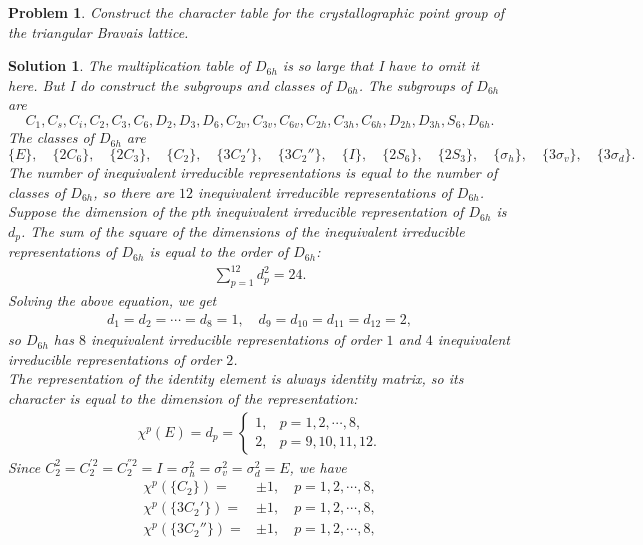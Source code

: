 \documentclass[UTF8,10pt,a4paper]{article}
\theoremstyle{Problem}
\newtheorem{prob}{Problem}
\theoremstyle{Solution}
\newtheorem*{sol}{Solution}
\begin{document}
\begin{prob}
    Construct the character table for the crystallographic point group of the triangular Bravais lattice.
\end{prob}
\begin{sol}
    The multiplication table of $D_{6h}$ is so large that I have to omit it here. But I do construct the subgroups and classes of $D_{6h}$. The subgroups of $D_{6h}$ are
    \[
        C_1,C_s,C_i,C_2,C_3,C_6,D_2,D_3,D_6,C_{2v},C_{3v},C_{6v},C_{2h},C_{3h},C_{6h},D_{2h},D_{3h},S_6,D_{6h}.
    \]
    The classes of $D_{6h}$ are
    \[
        \{E\},\quad\{2C_6\},\quad\{2C_3\},\quad\{C_2\},\quad\{3C_2'\},\quad\{3C_2''\},\quad\{I\},\quad\{2S_6\},\quad\{2S_3\},\quad\{\sigma_h\},\quad\{3\sigma_v\},\quad\{3\sigma_d\}.
    \]
    The number of inequivalent irreducible representations is equal to the number of classes of $D_{6h}$, so there are $12$ inequivalent irreducible representations of $D_{6h}$. Suppose the dimension of the $p$th inequivalent irreducible representation of $D_{6h}$ is $d_p$. The sum of the square of the dimensions of the inequivalent irreducible representations of $D_{6h}$ is equal to the order of $D_{6h}$:
    \begin{align}
        \sum_{p=1}^{12}d_p^2=24.
    \end{align}
    Solving the above equation, we get
    \begin{align}
        d_1=d_2=\cdots=d_8=1,\quad d_9=d_{10}=d_{11}=d_{12}=2,
    \end{align}
    so $D_{6h}$ has $8$ inequivalent irreducible representations of order $1$ and $4$ inequivalent irreducible representations of order $2$.\\
    The representation of the identity element is always identity matrix, so its character is equal to the dimension of the representation:
    \begin{align}
        \chi^p(E)=d_p=\left\{\begin{array}{ll}
            1,&p=1,2,\cdots,8,\\
            2,&p=9,10,11,12.
        \end{array}\right.
    \end{align}
    Since $C_2^2=C_2^{'2}=C_2^{''2}=I=\sigma_h^2=\sigma_v^2=\sigma_d^2=E$, we have
    \begin{align}
        \chi^p(\{C_2\})=&\pm 1,\quad p=1,2,\cdots,8,\\
        \chi^p(\{3C_2'\})=&\pm 1,\quad p=1,2,\cdots,8,\\
        \chi^p(\{3C_2''\})=&\pm 1,\quad p=1,2,\cdots,8,\\

\end{align}
\end{sol}
\end{document}
